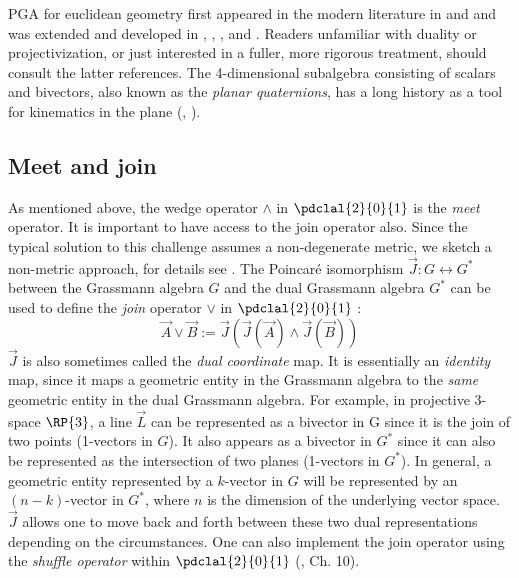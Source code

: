 \documentclass{birkjour}
\newcommand{\gTh}{\cite{gunnThesis}\xspace}
\begin{document}
{PGA for euclidean geometry first appeared in the modern literature in \cite{selig00} and \cite{selig05} and was extended and developed in \gTh, \cite{gunn2011}, \cite{gunnFull2010}, and \cite{gunn2016}. Readers unfamiliar with duality or projectivization, or just interested in a fuller, more rigorous treatment, should consult the latter references.  The  4-dimensional subalgebra consisting of scalars and bivectors, also known as the \emph{planar quaternions}, has a long history as a tool for kinematics in the plane (\cite{blaschke38}, \cite{mcc}). 

\subsection{Meet and join}

As mentioned above, the wedge operator $\wedge$ in $\pdclal{2}{0}{1}$ is the \emph{meet} operator. It is important to have access to the join operator also.   Since the typical solution to this challenge assumes a non-degenerate metric, we sketch a non-metric approach, for details see \cite{gunnThesis}.
The Poincar\'{e} isomorphism $\vec{J}: G \leftrightarrow G^{*}$ between the Grassmann algebra  $G$ and the dual Grassmann algebra $G^{*}$ can be used to define the \emph{join} operator $\vee$ in $\pdclal{2}{0}{1}$ :
\[ \vec{A} \vee \vec{B} := \vec{J}(\vec{J}(\vec{A}) \wedge \vec{J}(\vec{B})) \]
$\vec{J}$ is also sometimes called the \emph{dual coordinate} map. It is essentially an \emph{identity} map, since it maps a geometric entity in the Grassmann algebra to the \emph{same} geometric entity in the dual Grassmann algebra. For example, in projective 3-space $\RP{3}$, a line $\vec{L}$ can be represented as a bivector in G since it is the join of two points (1-vectors in $G$).  It also appears as a bivector in $G^*$ since it can also be represented as the intersection of two planes (1-vectors in $G^*$). In general, a geometric entity represented by a $k$-vector in $G$ will be represented by an $(n-k)$-vector in $G^*$, where $n$ is the dimension of the underlying vector space.  $\vec{J}$ allows one to move back and forth between these two dual representations depending on the circumstances. One can also implement the join operator using the  \emph{shuffle operator} within $\pdclal{2}{0}{1}$ (\cite{selig05}, Ch. 10).  %

 }
\end{document}
